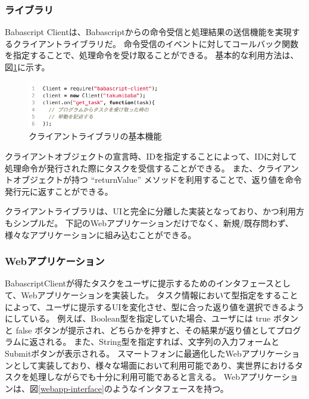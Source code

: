 \subsubsection{ライブラリ}\label{ux30e9ux30a4ux30d6ux30e9ux30ea}

Babascript
Clientは、Babascriptからの命令受信と処理結果の送信機能を実現するクライアントライブラリだ。
命令受信のイベントに対してコールバック関数を指定することで、処理命令を受け取ることができる。
基本的な利用方法は、図\ref{client}に示す。

\begin{figure}[h]
  \centering
  \includegraphics[width=220px]{./images/client.png}
  \caption{クライアントライブラリの基本機能 }
  \label{client}
\end{figure}

クライアントオブジェクトの宣言時、IDを指定することによって、IDに対して処理命令が発行された際にタスクを受信することができる。
また、クライアントオブジェクトが持つ ``returnValue''
メソッドを利用することで、返り値を命令発行元に返すことができる。

クライアントライブラリは、UIと完全に分離した実装となっており、かつ利用方もシンプルだ。
下記のWebアプリケーションだけでなく、新規/既存問わず、様々なアプリケーションに組み込むことができる。

\subsubsection{Webアプリケーション}\label{webux30a2ux30d7ux30eaux30b1ux30fcux30b7ux30e7ux30f3}

BabascriptClientが得たタスクをユーザに提示するためのインタフェースとして、Webアプリケーションを実装した。
タスク情報において型指定をすることによって、ユーザに提示するUIを変化させ、型に合った返り値を選択できるようにしている。
例えば、Boolean型を指定していた場合、ユーザには true ボタンと false
ボタンが提示され、どちらかを押すと、その結果が返り値としてプログラムに返される。
また、String型を指定すれば、文字列の入力フォームとSubmitボタンが表示される。
スマートフォンに最適化したWebアプリケーションとして実装しており、様々な場面において利用可能であり、実世界におけるタスクを処理しながらでも十分に利用可能であると言える。
Webアプリケーションは、図\ref{webapp-interface}のようなインタフェースを持つ。

